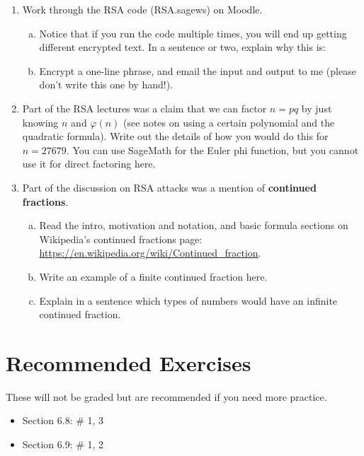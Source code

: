 \documentclass[12pt]{amsart}
\theoremstyle{plain}
\theoremstyle{definition}
\begin{document}
\begin{enumerate}[1.]
	\item Work through the RSA code (RSA.sagews) on Moodle.  
	\begin{enumerate}[a.]
		\item Notice that if you run the code multiple times, you will end up getting different encrypted text.  In a sentence or two, explain why this is:
		\begin{framed}
		\vspace{2.2in}
		\end{framed}
		\item Encrypt a one-line phrase, and email the input and output to me (please don't write this one by hand!).
	\end{enumerate}
	\newpage \item Part of the RSA lectures was a claim that we can factor $n = pq$ by just knowing $n$ and $\varphi(n)$ (see notes on using a certain polynomial and the quadratic formula).  Write out the details of how you would do this for $n = 27679$.  You can use SageMath for the Euler phi function, but you cannot use it for direct factoring here.
		\begin{framed}
		\vspace{2.5in}
		\end{framed}
	\item Part of the discussion on RSA attacks was a mention of \textbf{continued fractions}.
		\begin{enumerate}[a.]
			\item Read the intro, motivation and notation, and basic formula sections on Wikipedia's continued fractions page: \url{https://en.wikipedia.org/wiki/Continued_fraction}.\\
			\item Write an example of a finite continued fraction here.\\
				\begin{framed}
				\vspace{1.2in}
				\end{framed}
			\item Explain in a sentence which types of numbers would have an infinite continued fraction.
				\begin{framed}
				\vspace{.7in}
				\end{framed}
		\end{enumerate}
\end{enumerate}


\section{Recommended Exercises}
\noindent These will not be graded but are recommended if you need more practice.
\begin{itemize}
	\item Section 6.8: \# 1, 3
	\item Section 6.9: \# 1, 2
\end{itemize}
	
\end{document}
